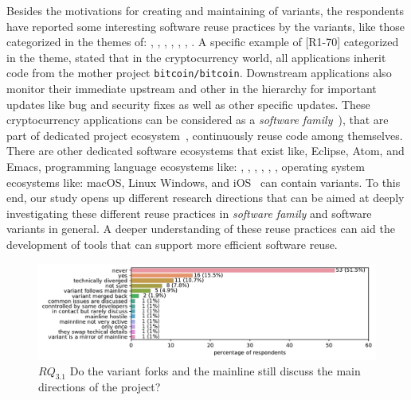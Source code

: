 Besides the motivations for creating and maintaining of variants, the respondents have reported some interesting software reuse practices by the variants, like those categorized in the themes of: , , , , , , . A specific example of [R1-70] categorized in the  theme, stated that in the cryptocurrency world, all applications inherit code from the mother project \texttt{bitcoin/bitcoin}. Downstream applications also monitor their immediate upstream and other in the hierarchy for important updates like bug and security fixes as well as other specific updates. These cryptocurrency applications can be considered as a \textit{software family}~\cite{businge:2018icsme,businge:emse:2021}), that are part of dedicated project ecosystem~\cite{tommens:2020}, continuously reuse code among themselves. 
There are other dedicated software ecosystems that exist like, \textsf{Eclipse}, \textsf{Atom}, and \textsf{Emacs}, programming language ecosystems like:  \java, \cp, \cpp, \py, \go, \rb, operating system ecosystems like: \textsf{macOS}, \textsf{Linux} \textsf{Windows}, and \textsf{iOS}~\cite{tommens:2020} can contain variants.
To this end, our study opens up different research directions that can be aimed at deeply investigating these different reuse practices in \textit{software family} and software variants in general. A deeper understanding of these reuse practices can aid the development of tools that can support more efficient software reuse. 


\begin{figure}[ht]
\begin{center}
    \centering
    \includegraphics[width=\columnwidth]{pdfs/discussions_rq3_colored.pdf}
    \caption{$RQ_{3.1}$ Do the variant forks and the mainline still discuss the main directions of the project?}
    \label{fig:discussions}
\end{center}
\vspace{-.3cm}
\end{figure}

